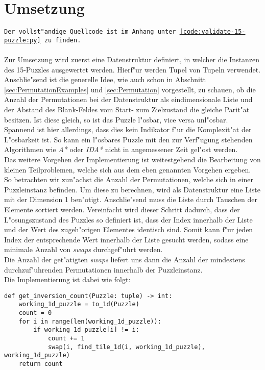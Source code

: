\section{Umsetzung} %
\label{cha:Umsetzung}
\texttt{Der vollst"andige Quellcode ist im Anhang unter \ref{code:validate-15-puzzle:py} zu finden.}\\\\
Zur Umsetzung wird zuerst eine Datenstruktur definiert, in welcher die Instanzen des 15-Puzzles ausgewertet werden. Hierf"ur werden Tupel von Tupeln verwendet.
Anschlie"send ist die generelle Idee, wie auch schon in Abschnitt \ref{sec:PermutationExamples} und \ref{sec:Permutation} vorgestellt, zu schauen, ob die Anzahl der Permutationen bei der Datenstruktur als eindimensionale Liste und der Abstand des Blank-Feldes vom Start- zum Zielzustand die gleiche Parit"at besitzen.
Ist diese gleich, so ist das Puzzle l"osbar, vice versa unl"osbar.\\
Spannend ist hier allerdings, dass dies kein Indikator f"ur die Komplexit"at der L"osbarkeit ist. So kann ein l"osbares Puzzle mit den zur Verf"ugung stehenden Algorithmen wie \textit{A*} oder \textit{IDA*} nicht in angemessener Zeit gel"ost werden.\\
Das weitere Vorgehen der Implementierung ist weitestgehend die Bearbeitung von kleinen Teilproblemen, welche sich aus dem eben genannten Vorgehen ergeben.\\
So betrachten wir zun"achst die Anzahl der Permutationen, welche sich in einer Puzzleinstanz befinden. Um diese zu berechnen, wird als Datenstruktur eine Liste mit der Dimension 1 ben"otigt.
Anschlie"send muss die Liste durch Tauschen der Elemente sortiert werden.
Vereinfacht wird dieser Schritt dadurch, dass der L"osungszustand des Puzzles so definiert ist, dass der Index innerhalb der Liste und der Wert des zugeh"origen Elementes identisch sind. Somit kann f"ur jeden Index der entsprechende Wert innerhalb der Liste gesucht werden, sodass eine minimale Anzahl von \textit{swaps} durchgef"uhrt werden. \\Die Anzahl der get"atigten \textit{swaps} liefert uns dann die Anzahl der mindestens durchzuf"uhrenden Permutationen innerhalb der Puzzleinstanz.\\
Die Implementierung ist dabei wie folgt:
\begin{verbatim}
def get_inversion_count(Puzzle: tuple) -> int:
    working_1d_puzzle = to_1d(Puzzle)
    count = 0
    for i in range(len(working_1d_puzzle)):
        if working_1d_puzzle[i] != i:
            count += 1
            swap(i, find_tile_1d(i, working_1d_puzzle), working_1d_puzzle)
    return count
\end{verbatim}
